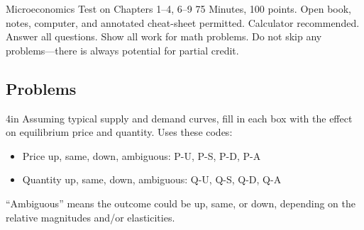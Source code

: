 \documentclass[12pt]{exam}
\begin{document}
\FontEasyRead

\newcommand{\entryblank}{\raisebox{0.4ex}{\rule{0.4cm}{0.6pt}}}

\Heading
{Microeconomics}
{Test on Chapters 1--4, 6--9}
{75 Minutes, 100 points.
  Open book, notes, computer, and annotated cheat-sheet permitted.
  Calculator recommended.
  Answer all questions. Show all work for math problems.
Do not skip any problems---there is always potential for partial credit.}

\begin{questions}

  \section*{Problems}

  \begin{problem}[15]{4in}
    Assuming typical supply and demand curves, fill in each box with the effect on
    equilibrium price and quantity. Uses these codes:

    \begin{itemize}
      \item Price up, same, down, ambiguous: P-U, P-S, P-D, P-A
      \item Quantity up, same, down, ambiguous:  Q-U, Q-S, Q-D, Q-A
    \end{itemize}

    ``Ambiguous'' means the outcome could be up, same, or down, depending on the
    relative magnitudes and/or elasticities.

    \vspace{0.5cm}

    \begin{center}
\end{center}
\end{problem}
\end{questions}
\end{document}
